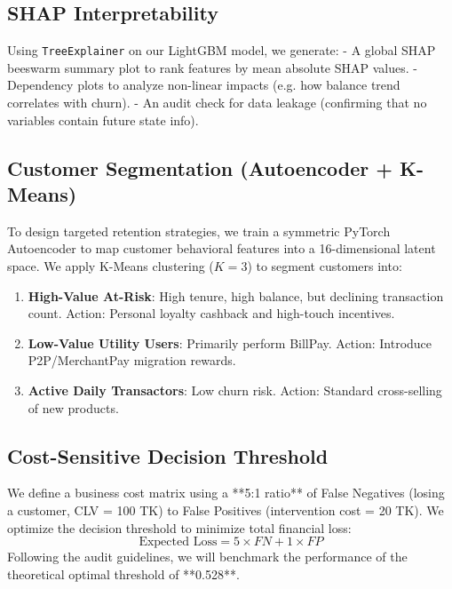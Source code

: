 \documentclass[11pt,a4paper]{article}
\begin{document}
\subsection{SHAP Interpretability}
Using \texttt{TreeExplainer} on our LightGBM model, we generate:
- A global SHAP beeswarm summary plot to rank features by mean absolute SHAP values.
- Dependency plots to analyze non-linear impacts (e.g. how balance trend correlates with churn).
- An audit check for data leakage (confirming that no variables contain future state info).

\subsection{Customer Segmentation (Autoencoder + K-Means)}
To design targeted retention strategies, we train a symmetric PyTorch Autoencoder to map customer behavioral features into a 16-dimensional latent space. We apply K-Means clustering ($K=3$) to segment customers into:
\begin{enumerate}
    \item \textbf{High-Value At-Risk}: High tenure, high balance, but declining transaction count. Action: Personal loyalty cashback and high-touch incentives.
    \item \textbf{Low-Value Utility Users}: Primarily perform BillPay. Action: Introduce P2P/MerchantPay migration rewards.
    \item \textbf{Active Daily Transactors}: Low churn risk. Action: Standard cross-selling of new products.
\end{enumerate}

\subsection{Cost-Sensitive Decision Threshold}
We define a business cost matrix using a **5:1 ratio** of False Negatives (losing a customer, CLV = 100 TK) to False Positives (intervention cost = 20 TK). We optimize the decision threshold to minimize total financial loss:
$$\text{Expected Loss} = 5 \times FN + 1 \times FP$$
Following the audit guidelines, we will benchmark the performance of the theoretical optimal threshold of **0.528**.
\end{document}
